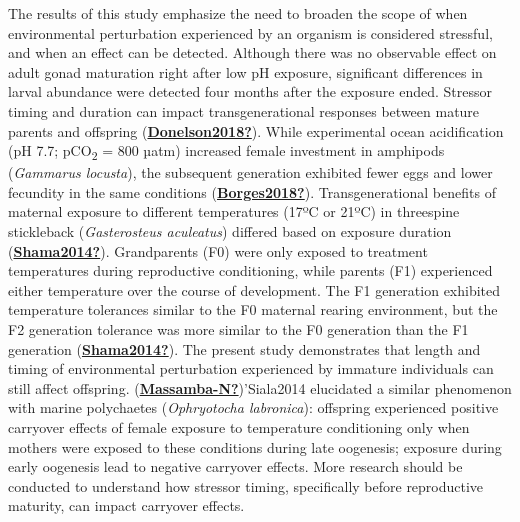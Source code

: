 \documentclass [11pt, proquest] {uwthesis}[2015/03/03]
\begin{document}
The results of this study emphasize the need to broaden the scope of when environmental perturbation experienced by an organism is considered stressful, and when an effect can be detected. Although there was no observable effect on adult gonad maturation right after low pH exposure, significant differences in larval abundance were detected four months after the exposure ended. Stressor timing and duration can impact transgenerational responses between mature parents and offspring (\protect\hyperlink{ref-Donelson2018}{\textbf{Donelson2018?}}). While experimental ocean acidification (pH 7.7; pCO\textsubscript{2} = 800 µatm) increased female investment in amphipods (\emph{Gammarus locusta}), the subsequent generation exhibited fewer eggs and lower fecundity in the same conditions (\protect\hyperlink{ref-Borges2018}{\textbf{Borges2018?}}). Transgenerational benefits of maternal exposure to different temperatures (17ºC or 21ºC) in threespine stickleback (\emph{Gasterosteus aculeatus}) differed based on exposure duration (\protect\hyperlink{ref-Shama2014}{\textbf{Shama2014?}}). Grandparents (F0) were only exposed to treatment temperatures during reproductive conditioning, while parents (F1) experienced either temperature over the course of development. The F1 generation exhibited temperature tolerances similar to the F0 maternal rearing environment, but the F2 generation tolerance was more similar to the F0 generation than the F1 generation (\protect\hyperlink{ref-Shama2014}{\textbf{Shama2014?}}). The present study demonstrates that length and timing of environmental perturbation experienced by immature individuals can still affect offspring. (\protect\hyperlink{ref-Massamba-N}{\textbf{Massamba-N?}})'Siala2014 elucidated a similar phenomenon with marine polychaetes (\emph{Ophryotocha labronica}): offspring experienced positive carryover effects of female exposure to temperature conditioning only when mothers were exposed to these conditions during late oogenesis; exposure during early oogenesis lead to negative carryover effects. More research should be conducted to understand how stressor timing, specifically before reproductive maturity, can impact carryover effects.
\end{document}

